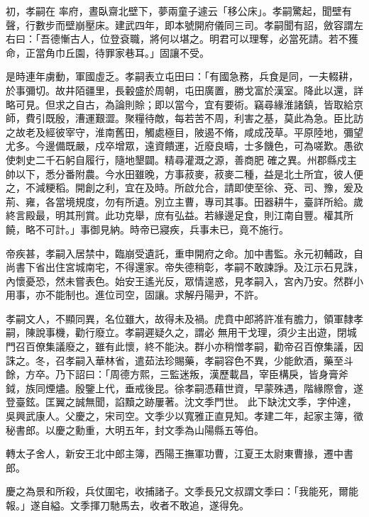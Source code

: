 \begin{pinyinscope}
 初，孝嗣在
 率府，晝臥齋北壁下，夢兩童子遽云「移公床」。孝嗣驚起，聞壁有聲，行數步而壁崩壓床。建武四年，即本號開府儀同三司。孝嗣聞有詔，斂容謂左右曰：「吾德慚古人，位登袞職，將何以堪之。明君可以理奪，必當死請。若不獲命，正當角巾丘園，待罪家巷耳。」固讓不受。



 是時連年虜動，軍國虛乏。孝嗣表立屯田曰：「有國急務，兵食是同，一夫輟耕，於事彌切。故井陌疆里，長轂盛於周朝，屯田廣置，勝戈富於漢室。降此以還，詳略可見。但求之自古，為論則賒；即以當今，宜有要術。竊尋緣淮諸鎮，皆取給京師，費引既殷，漕運艱澀。聚糧待敵，每若苦不周，利害之基，莫此為急。臣比訪之故老及經彼宰守，淮南舊田，觸處極目，陂遏不脩，咸成茂草。平原陸地，彌望尤多。今邊備既嚴，戍卒增眾，遠資饋運，近廢良疇，士多饑色，可為嗟歎。愚欲使刺史二千石躬自履行，隨地墾闢。精尋灌溉之源，善商肥
 確之異。州郡縣戍主帥以下，悉分番附農。今水田雖晚，方事菽麥，菽麥二種，益是北土所宜，彼人便之，不減粳稻。開創之利，宜在及時。所啟允合，請即使至徐、兗、司、豫，爰及荊、雍，各當境規度，勿有所遺。別立主曹，專司其事。田器耕牛，臺詳所給。歲終言殿最，明其刑賞。此功克舉，庶有弘益。若緣邊足食，則江南自豐。權其所饒，略不可計。」事御見納。時帝已寢疾，兵事未已，竟不施行。



 帝疾甚，孝嗣入居禁中，臨崩受遺託，重申開府之命。加中書監。永元初輔政，自尚書下省出住宮城南宅，不得還家。帝失德稍彰，孝嗣不敢諫諍。及江示石見誅，內懷憂恐，然未嘗表色。始安王遙光反，眾情遑惑，見孝嗣入，宮內乃安。然群小用事，亦不能制也。進位司空，固讓。求解丹陽尹，不許。



 孝嗣文人，不顯同異，名位雖大，故得未及禍。虎賁中郎將許准有膽力，領軍隸孝嗣，陳說事機，勸行廢立。孝嗣遲疑久之，謂必
 無用干戈理，須少主出遊，閉城門召百僚集議廢之，雖有此懷，終不能決。群小亦稍憎孝嗣，勸帝召百僚集議，因誅之。冬，召孝嗣入華林省，遣茹法珍賜藥，孝嗣容色不異，少能飲酒，藥至斗餘，方卒。乃下詔曰：「周德方熙，三監迷叛，漢歷載昌，宰臣構戾，皆身膏斧鉞，族同煙燼。殷鑒上代，垂戒後昆。徐孝嗣憑藉世資，早蒙殊遇，階緣際會，遂登臺鉉。匡翼之誠無聞，諂黷之跡屢著。沈文季門世。
 此下缺沈文季，字仲達，吳興武康人。父慶之，宋司空。文季少以寬雅正直見知。孝建二年，起家主簿，徵秘書郎。以慶之勳重，大明五年，封文季為山陽縣五等伯。



 轉太子舍人，新安王北中郎主簿，西陽王撫軍功曹，江夏王太尉東曹掾，遷中書郎。



 慶之為景和所殺，兵仗圍宅，收捕諸子。文季長兄文叔謂文季曰：「我能死，爾能報。」遂自縊。文季揮刀馳馬去，收者不敢追，遂得免。




\end{pinyinscope}
